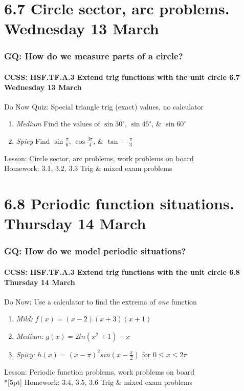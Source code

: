 \documentclass{beamer}
\begin{document}
\section{6.7 Circle sector, arc problems. Wednesday 13 March}
  \frame
  {
    \frametitle{GQ: How do we measure parts of a circle?}
    \framesubtitle{CCSS: HSF.TF.A.3 Extend trig functions with the unit circle  \hfill \alert{6.7 Wednesday 13 March}}

    \begin{block}{Do Now Quiz: Special triangle trig (exact) values, no calculator}
    \begin{enumerate}
        \item \emph{Medium} Find the values of $\sin 30^\circ$, $\sin 45^\circ$, \& $\sin 60^\circ$
        \item \emph{Spicy} Find $\sin \frac{\pi}{6}$, $\cos \frac{3\pi}{4}$, \& $\tan -\frac{\pi}{3}$
    \end{enumerate}
    \end{block}
    Lesson: Circle sector, arc problems, work problems on board\\%
    Homework: 3.1, 3.2, 3.3 Trig \& mixed exam problems
  }

\section{6.8 Periodic function situations. Thursday 14 March}
  \frame
  {
    \frametitle{GQ: How do we model periodic situations?}
    \framesubtitle{CCSS: HSF.TF.A.3 Extend trig functions with the unit circle  \hfill \alert{6.8 Thursday 14 March}}

    \begin{block}{Do Now: Use a calculator to find the extrema of \emph{one} function}
    \begin{enumerate}
        \item \emph{Mild:} $f(x)=(x-2)(x+3)(x+1)$
        \item \emph{Medium:} $g(x)=2ln(x^2+1)-x$
        \item \emph{Spicy:} $h(x)= (x-\pi)^2 sin(x-\frac{\pi}{2})$ for $0 \leq x\leq 2\pi$
    \end{enumerate}
    \end{block}
    Lesson: Periodic function problems, work problems on board\\*[5pt]
    Homework: 3.4, 3.5, 3.6 Trig \& mixed exam problems
  }
\end{document}
